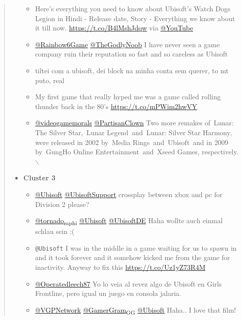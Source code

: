\documentclass[11pt]{article}
\begin{document}
\begin{quote}
\begin{itemize}
\begin{itemize}
\item Here's everything you need to know about Ubisoft's Watch Dogs Legion in
Hindi - Release date, Story - Everything we know about it till now.
\url{https://t.co/B4lMshJdqw} via \href{https://twitter.com/search?q=\%40YouTube}{@YouTube}
\item \href{https://twitter.com/search?q=\%40Rainbow6Game}{@Rainbow6Game} \href{https://twitter.com/search?q=\%40TheGodlyNoob}{@TheGodlyNoob} I have never seen a game company ruin their
reputation so fast and so careless as Ubisoft
\item tiltei com a ubisoft, dei block na minha conta sem querer, to mt puto, real
\item My first game that really hyped me was a game called rolling thunder back in
the 80’s \url{https://t.co/mPWim2hwVY}
\item \href{https://twitter.com/search?q=\%40videogamemorals}{@videogamemorals} \href{https://twitter.com/search?q=\%40PartisanClown}{@PartisanClown} Two more remakes of Lunar: The Silver
Star, Lunar Legend and Lunar: Silver Star Harmony, were released in 2002
by Media Rings and Ubisoft and in 2009 by GungHo Online
Entertainment and Xseed Games, respectively.$\backslash$
\end{itemize}
\item \textbf{Cluster 3}
\begin{itemize}
\item \href{https://twitter.com/search?q=\%40Ubisoft}{@Ubisoft} \href{https://twitter.com/search?q=\%40UbisoftSupport}{@UbisoftSupport} crossplay between xbox and pc for Division 2
please?
\item \href{https://twitter.com/search?q=\%40tornado\_raphi}{@tornado\textsubscript{raphi}} \href{https://twitter.com/search?q=\%40Ubisoft}{@Ubisoft} \href{https://twitter.com/search?q=\%40UbisoftDE}{@UbisoftDE} Haha wollte auch einmal schlau sein
:(
\item \texttt{@Ubisoft} I was in the middle in a game waiting for us to spawn in and it
took forever and it somehow kicked me from the game for inactivity. Anyway to
fix this \url{https://t.co/Uz1yZ73R4M}
\item \href{https://twitter.com/search?q=\%40Operatedleech87}{@Operatedleech87} Yo lo veia al revez algo de Ubisoft en Girls Frontline,
pero igual un juego en consola jalaria.
\item \href{https://twitter.com/search?q=\%40VGPNetwork}{@VGPNetwork} \href{https://twitter.com/search?q=\%40GamerGram\_GG}{@GamerGram\textsubscript{GG}} \href{https://twitter.com/search?q=\%40Ubisoft}{@Ubisoft} Haha.. I love that film!
\end{itemize}
\end{itemize}
\end{quote}
\end{document}
